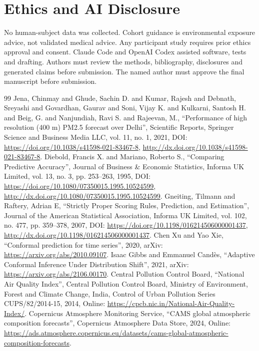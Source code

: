 \documentclass[journal]{IEEEtran}
\begin{document}
\section*{Ethics and AI Disclosure}
No human-subject data was collected. Cohort guidance is environmental exposure
advice, not validated medical advice. Any participant study requires prior
ethics approval and consent. Claude Code and OpenAI Codex assisted software,
tests and drafting. Authors must review the methods, bibliography, disclosures
and generated claims before submission. The named author must approve the final manuscript before submission.
\begin{thebibliography}{99}
 Jena, Chinmay and Ghude, Sachin D. and Kumar, Rajesh and Debnath, Sreyashi and Govardhan, Gaurav and Soni, Vijay K. and Kulkarni, Santosh H. and Beig, G. and Nanjundiah, Ravi S. and Rajeevan, M., ``Performance of high resolution (400 m) PM2.5 forecast over Delhi'', Scientific Reports, Springer Science and Business Media LLC, vol. 11, no. 1, 2021, DOI: \url{https://doi.org/10.1038/s41598-021-83467-8}, \url{http://dx.doi.org/10.1038/s41598-021-83467-8}.
 Diebold, Francis X. and Mariano, Roberto S., ``Comparing Predictive Accuracy'', Journal of Business \& Economic Statistics, Informa UK Limited, vol. 13, no. 3, pp. 253--263, 1995, DOI: \url{https://doi.org/10.1080/07350015.1995.10524599}, \url{http://dx.doi.org/10.1080/07350015.1995.10524599}.
 Gneiting, Tilmann and Raftery, Adrian E, ``Strictly Proper Scoring Rules, Prediction, and Estimation'', Journal of the American Statistical Association, Informa UK Limited, vol. 102, no. 477, pp. 359--378, 2007, DOI: \url{https://doi.org/10.1198/016214506000001437}, \url{http://dx.doi.org/10.1198/016214506000001437}.
 Chen Xu and Yao Xie, ``Conformal prediction for time series'', 2020, arXiv: \url{https://arxiv.org/abs/2010.09107}.
 Isaac Gibbs and Emmanuel Candès, ``Adaptive Conformal Inference Under Distribution Shift'', 2021, arXiv: \url{https://arxiv.org/abs/2106.00170}.
 {Central Pollution Control Board}, ``National Air Quality Index'', Central Pollution Control Board, Ministry of Environment, Forest and Climate Change, India, Control of Urban Pollution Series CUPS/82/2014-15, 2014, Online: \url{https://cpcb.nic.in/National-Air-Quality-Index/}.
 {Copernicus Atmosphere Monitoring Service}, ``CAMS global atmospheric composition forecasts'', Copernicus Atmosphere Data Store, 2024, Online: \url{https://ads.atmosphere.copernicus.eu/datasets/cams-global-atmospheric-composition-forecasts}.

\end{thebibliography}
\end{document}
